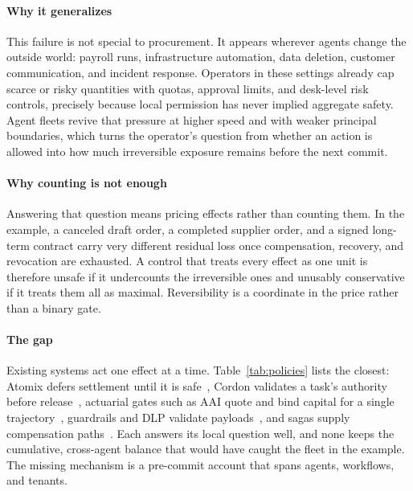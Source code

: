 \documentclass[sigconf]{acmart}
\begin{document}
\paragraph{Why it generalizes} This failure is not special to procurement. It appears wherever agents change the outside world: payroll runs, infrastructure automation, data deletion, customer communication, and incident response. Operators in these settings already cap scarce or risky quantities with quotas, approval limits, and desk-level risk controls, precisely because local permission has never implied aggregate safety. Agent fleets revive that pressure at higher speed and with weaker principal boundaries, which turns the operator's question from whether an action is allowed into how much irreversible exposure remains before the next commit.

\paragraph{Why counting is not enough} Answering that question means pricing effects rather than counting them. In the example, a canceled draft order, a completed supplier order, and a signed long-term contract carry very different residual loss once compensation, recovery, and revocation are exhausted. A control that treats every effect as one unit is therefore unsafe if it undercounts the irreversible ones and unusably conservative if it treats them all as maximal. Reversibility is a coordinate in the price rather than a binary gate.

\paragraph{The gap} Existing systems act one effect at a time. Table~\ref{tab:policies} lists the closest: Atomix defers settlement until it is safe~\cite{Mohammadi2026Atomix}, Cordon validates a task's authority before release~\cite{Chen2026Cordon}, actuarial gates such as AAI quote and bind capital for a single trajectory~\cite{Chen2026AAI}, guardrails and DLP validate payloads~\cite{OWASP2025AgenticThreats}, and sagas supply compensation paths~\cite{GarciaMolina1987Sagas,Helland2007LifeBeyond}. Each answers its local question well, and none keeps the cumulative, cross-agent balance that would have caught the fleet in the example. The missing mechanism is a pre-commit account that spans agents, workflows, and tenants.
\end{document}
